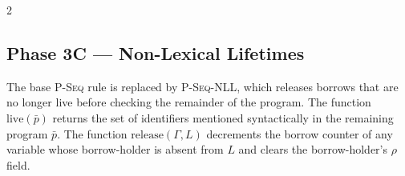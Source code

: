 \vspace{0.5em}
\begin{multicols}{2}

    \begin{prooftree}
    \end{prooftree}

    \columnbreak

    \begin{prooftree}
    \end{prooftree}

\end{multicols}

\subsection*{Phase 3C --- Non-Lexical Lifetimes}

The base \textsc{P-Seq} rule is replaced by \textsc{P-Seq-NLL}, which releases
borrows that are no longer live before checking the remainder of the program.
The function $\mathrm{live}(\bar{p})$ returns the set of identifiers mentioned
syntactically in the remaining program $\bar{p}$.
The function $\mathrm{release}(\Gamma, L)$ decrements the borrow counter of
any variable whose borrow-holder is absent from $L$ and clears the
borrow-holder's $\rho$ field.

\begin{prooftree}
\end{prooftree}

